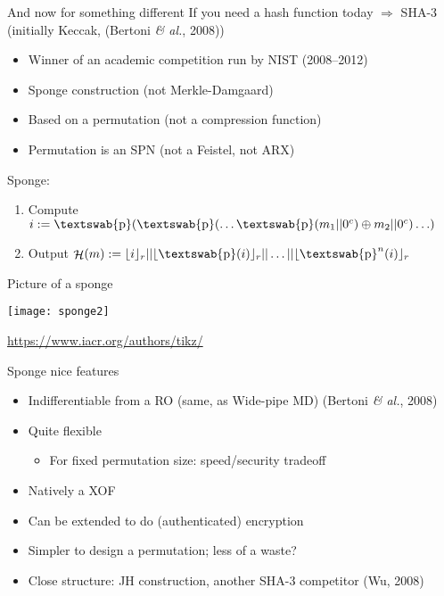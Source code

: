 \documentclass[xcolor=table,usenames,dvipsnames,compress]{beamer}
\newcommand\etal{\emph{\& al.}\xspace}
\newcommand\defas{:=}
\DeclareMathOperator\hash{\mathcal{H}}
\DeclareMathOperator\perm{\textswab{p}}
\begin{document}
\begin{frame}{And now for something different}
If you need a hash function today $\Rightarrow$ SHA-3 (initially Keccak, (Bertoni \etal, 2008))
\begin{itemize}
\item Winner of an academic competition run by NIST (2008--2012)
\end{itemize}
\begin{itemize}
\item Sponge construction (not Merkle-Damgaard)
\item Based on a permutation (not a compression function)
\item Permutation is an SPN (not a Feistel, not ARX)
\end{itemize}

Sponge:
\begin{enumerate}
\item Compute $i \defas \perm(\perm(\ldots\perm(m_1||0^c)\oplus m_2||0^c)\ldots)$
\item Output $\hash(m) \defas \lfloor i \rfloor_r || \lfloor \perm(i) \rfloor_r || \ldots || \lfloor \perm^n(i) \rfloor_r$
\end{enumerate}

\end{frame}

\begin{frame}{Picture of a sponge}
\begin{center}
\texttt{[image: sponge2]}
\end{center}
\url{https://www.iacr.org/authors/tikz/}
\end{frame}

\begin{frame}{Sponge nice features}
\begin{itemize}
\item Indifferentiable from a RO (same, as Wide-pipe MD) (Bertoni \etal, 2008)
\item Quite flexible
\begin{itemize}
\item For fixed permutation size: speed/security tradeoff
\end{itemize}
\item Natively a XOF
\item Can be extended to do (authenticated) encryption
\item Simpler to design a permutation; less of a waste?
\end{itemize}

\begin{itemize}
\item Close structure: JH construction, another SHA-3 competitor (Wu, 2008)
\end{itemize}

\end{frame}
\end{document}
